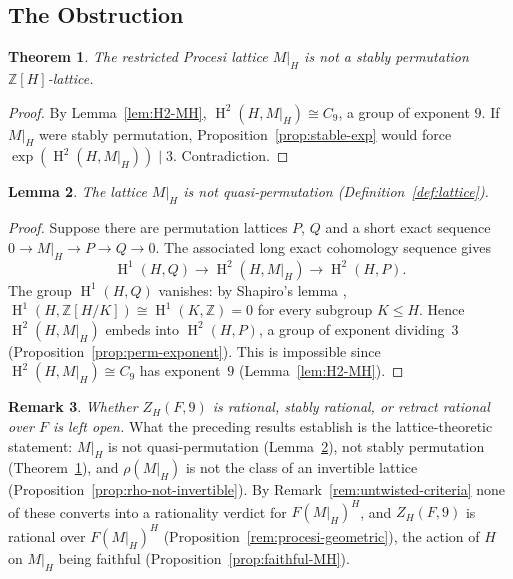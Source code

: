 \documentclass[12pt,a4paper]{article}
\newtheorem{theorem}{Theorem}[section]
\newtheorem{lemma}[theorem]{Lemma}
\theoremstyle{definition}
\newtheorem{remark}[theorem]{Remark}
\DeclareMathOperator{\coh}{H}
\begin{document}
\subsection{The Obstruction}

\begin{theorem}\label{thm:not-stably-perm}
The restricted Procesi lattice \(M|_H\) is not a stably permutation
\(\mathbb{Z}[H]\)-lattice.
\end{theorem}

\begin{proof}
By Lemma~\ref{lem:H2-MH}, \(\coh^2(H, M|_H) \cong C_9\), a group of exponent
\(9\).  If \(M|_H\) were stably permutation, Proposition~\ref{prop:stable-exp}
would force \(\exp(\coh^2(H, M|_H)) \mid 3\).  Contradiction.
\end{proof}

\begin{lemma}\label{lem:not-quasi-perm}
The lattice \(M|_H\) is not quasi-permutation
(Definition~\ref{def:lattice}).
\end{lemma}

\begin{proof}
Suppose there are permutation lattices \(P\), \(Q\) and a short exact
sequence \(0 \to M|_H \to P \to Q \to 0\).  The associated long
exact cohomology sequence gives
\[
\coh^1(H, Q) \longrightarrow \coh^2(H, M|_H)
\longrightarrow \coh^2(H, P) .
\]
The group \(\coh^1(H, Q)\) vanishes: by Shapiro's lemma
\cite[Theorem~6.3.2]{Weibel1994},
\(\coh^1(H, \mathbb{Z}[H/K]) \cong \coh^1(K, \mathbb{Z}) = 0\) for
every subgroup \(K \le H\).  Hence \(\coh^2(H, M|_H)\) embeds into
\(\coh^2(H, P)\), a group of exponent dividing~\(3\)
(Proposition~\ref{prop:perm-exponent}).  This is impossible since
\(\coh^2(H, M|_H) \cong C_9\) has exponent~\(9\)
(Lemma~\ref{lem:H2-MH}).
\end{proof}

\begin{remark}\label{rem:open-verdicts}
\emph{Whether \(Z_H(F,9)\) is rational, stably rational, or retract
rational over \(F\) is left open.}  What the preceding results establish
is the lattice-theoretic statement: \(M|_H\) is not quasi-permutation
(Lemma~\ref{lem:not-quasi-perm}), not stably permutation
(Theorem~\ref{thm:not-stably-perm}), and \(\rho(M|_H)\) is not the class
of an invertible lattice (Proposition~\ref{prop:rho-not-invertible}).
By Remark~\ref{rem:untwisted-criteria} none of these converts into a
rationality verdict for \(F(M|_H)^H\), and \(Z_H(F,9)\) is rational over
\(F(M|_H)^H\) (Proposition~\ref{rem:procesi-geometric}), the action of
\(H\) on \(M|_H\) being faithful (Proposition~\ref{prop:faithful-MH}).
\end{remark}
\end{document}
